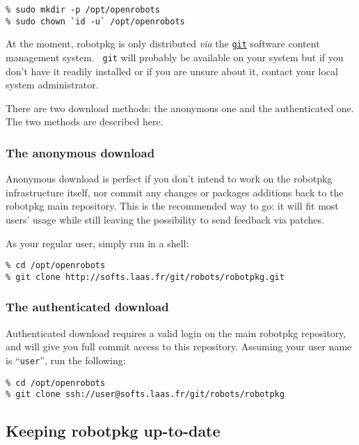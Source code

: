 \begin{verbatim}
% sudo mkdir -p /opt/openrobots
% sudo chown `id -u` /opt/openrobots
\end{verbatim}

At  the    moment,  robotpkg   is      only   distributed    {\em  via}     the
\href{http://git-scm.com/}{\tt git}  software content  management  system. {\tt
git} will probably be available on your system but if you don't have it readily
installed   or if  you  are   unsure  about  it,   contact your  local   system
administrator.

There are two download methods: the anonymous one and the authenticated
one. The two methods are described here.


\subsubsection{The anonymous download}

Anonymous  download is perfect  if  you don't intend  to  work on  the robotpkg
infrastructure itself, nor commit any changes or packages additions back to the
robotpkg main repository.  This is the recommended way  to go: it will fit most
users' usage while still leaving the possibility to send feedback via patches.

As your regular user, simply run in a shell:

\begin{verbatim}
% cd /opt/openrobots
% git clone http://softs.laas.fr/git/robots/robotpkg.git
\end{verbatim}


\subsubsection{The authenticated download}

Authenticated download requires a valid login  on the main robotpkg repository,
and  will give you  full commit access to this   repository. Assuming your user
name is ``{\tt user}'', run the following:

\begin{verbatim}
% cd /opt/openrobots
% git clone ssh://user@softs.laas.fr/git/robots/robotpkg
\end{verbatim}


\subsection{Keeping robotpkg up-to-date} %

